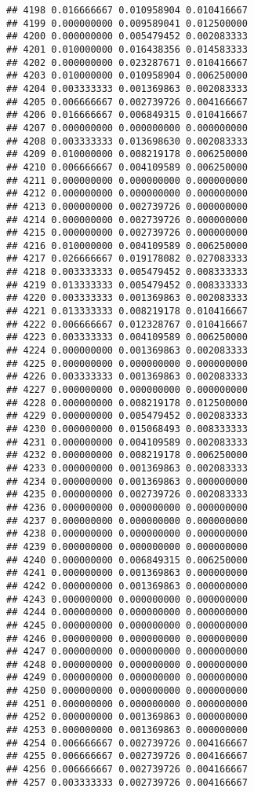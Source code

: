 \documentclass[
]{article}
\begin{document}
\begin{verbatim}
## 4198 0.016666667 0.010958904 0.010416667
## 4199 0.000000000 0.009589041 0.012500000
## 4200 0.000000000 0.005479452 0.002083333
## 4201 0.010000000 0.016438356 0.014583333
## 4202 0.000000000 0.023287671 0.010416667
## 4203 0.010000000 0.010958904 0.006250000
## 4204 0.003333333 0.001369863 0.002083333
## 4205 0.006666667 0.002739726 0.004166667
## 4206 0.016666667 0.006849315 0.010416667
## 4207 0.000000000 0.000000000 0.000000000
## 4208 0.003333333 0.013698630 0.002083333
## 4209 0.010000000 0.008219178 0.006250000
## 4210 0.006666667 0.004109589 0.006250000
## 4211 0.000000000 0.000000000 0.000000000
## 4212 0.000000000 0.000000000 0.000000000
## 4213 0.000000000 0.002739726 0.000000000
## 4214 0.000000000 0.002739726 0.000000000
## 4215 0.000000000 0.002739726 0.000000000
## 4216 0.010000000 0.004109589 0.006250000
## 4217 0.026666667 0.019178082 0.027083333
## 4218 0.003333333 0.005479452 0.008333333
## 4219 0.013333333 0.005479452 0.008333333
## 4220 0.003333333 0.001369863 0.002083333
## 4221 0.013333333 0.008219178 0.010416667
## 4222 0.006666667 0.012328767 0.010416667
## 4223 0.003333333 0.004109589 0.006250000
## 4224 0.000000000 0.001369863 0.002083333
## 4225 0.000000000 0.000000000 0.000000000
## 4226 0.003333333 0.001369863 0.002083333
## 4227 0.000000000 0.000000000 0.000000000
## 4228 0.000000000 0.008219178 0.012500000
## 4229 0.000000000 0.005479452 0.002083333
## 4230 0.000000000 0.015068493 0.008333333
## 4231 0.000000000 0.004109589 0.002083333
## 4232 0.000000000 0.008219178 0.006250000
## 4233 0.000000000 0.001369863 0.002083333
## 4234 0.000000000 0.001369863 0.000000000
## 4235 0.000000000 0.002739726 0.002083333
## 4236 0.000000000 0.000000000 0.000000000
## 4237 0.000000000 0.000000000 0.000000000
## 4238 0.000000000 0.000000000 0.000000000
## 4239 0.000000000 0.000000000 0.000000000
## 4240 0.000000000 0.006849315 0.006250000
## 4241 0.000000000 0.001369863 0.000000000
## 4242 0.000000000 0.001369863 0.000000000
## 4243 0.000000000 0.000000000 0.000000000
## 4244 0.000000000 0.000000000 0.000000000
## 4245 0.000000000 0.000000000 0.000000000
## 4246 0.000000000 0.000000000 0.000000000
## 4247 0.000000000 0.000000000 0.000000000
## 4248 0.000000000 0.000000000 0.000000000
## 4249 0.000000000 0.000000000 0.000000000
## 4250 0.000000000 0.000000000 0.000000000
## 4251 0.000000000 0.000000000 0.000000000
## 4252 0.000000000 0.001369863 0.000000000
## 4253 0.000000000 0.001369863 0.000000000
## 4254 0.006666667 0.002739726 0.004166667
## 4255 0.006666667 0.002739726 0.004166667
## 4256 0.006666667 0.002739726 0.004166667
## 4257 0.003333333 0.002739726 0.004166667

\end{verbatim}
\end{document}
